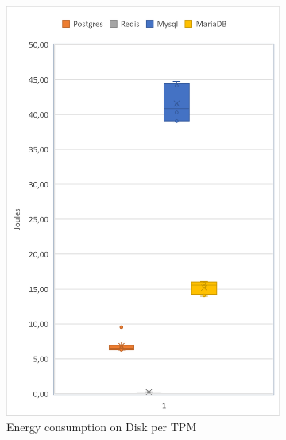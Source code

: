 \begin{figure}[!ht]
\begin{subfigure}[b]{0.32\textwidth}
            \includegraphics[width=1\columnwidth]{results/boxplot/10m/Disk-tpm.png}
            \caption[]%
            {{\small Energy consumption on Disk per TPM}}    
            \label{fig:bocplottransdisk10m}
        \end{subfigure}
        \begin{subfigure}[b]{0.32\textwidth}  
            \centering 

\end{subfigure}
\end{figure}
